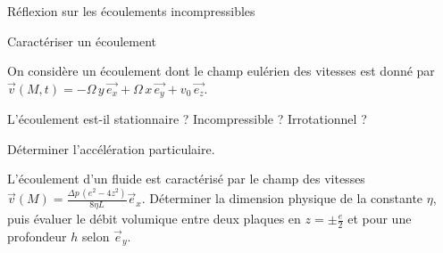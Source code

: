 \begin{exo}[PC][1][TD]{Réflexion sur les écoulements incompressibles}
\begin{quest}
\end{quest}
\end{exo}

\begin{exo}[PC][1]{Caractériser un écoulement}
\begin{quest}
\item On considère un écoulement dont le champ eulérien des vitesses est donné par $\vec{v}(M,t)=-\Omega\,y\,\vec{e_x}+\Omega\,x\,\vec{e_y}+v_{0}\,\vec{e_z}$.
\begin{quest}
\item L'écoulement est-il stationnaire ? Incompressible ? Irrotationnel ?
\item Déterminer l'accélération particulaire.
\end{quest}
\item L'écoulement d'un fluide est caractérisé par le champ des vitesses $\vec{v}(M)=\frac{\Delta p\,(e^2-4z^2)}{8\eta L}\vec{e}_x$. Déterminer la dimension physique de la constante $\eta$, puis évaluer le débit volumique entre deux plaques en $z=\pm \frac{e}{2}$ et pour une profondeur $h$ selon $\vec{e}_y$.
\end{quest}
\end{exo}


